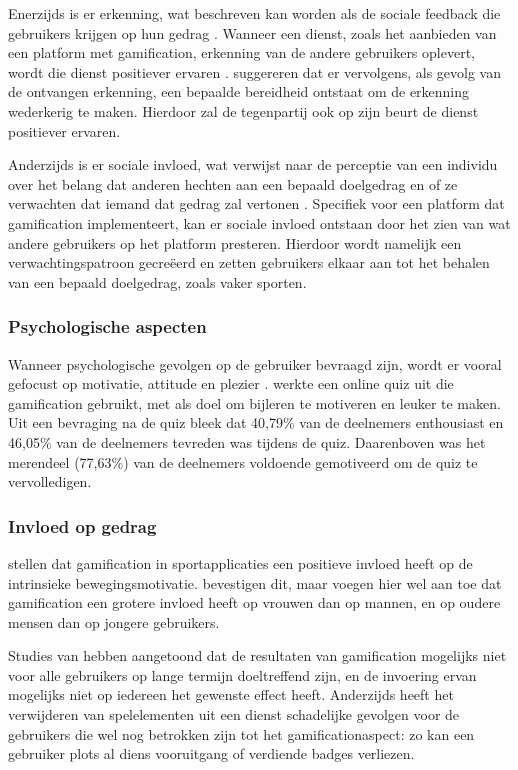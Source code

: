 Enerzijds is er erkenning, wat beschreven kan worden als de sociale feedback die gebruikers krijgen op hun gedrag \autocite{Cheung2011}.
Wanneer een dienst, zoals het aanbieden van een platform met gamification, erkenning van de andere gebruikers oplevert, wordt die dienst positiever ervaren \autocite{Preece2001}.
\textcite{Hamari2013} suggereren dat er vervolgens, als gevolg van de ontvangen erkenning, een bepaalde bereidheid ontstaat om de erkenning wederkerig te maken. Hierdoor zal de tegenpartij ook op zijn beurt de dienst positiever ervaren.

Anderzijds is er sociale invloed, wat verwijst naar de perceptie van een individu over het belang dat anderen hechten aan een bepaald doelgedrag en of ze verwachten dat iemand dat gedrag zal vertonen \autocite{Ajzen1991}. Specifiek voor een platform dat gamification implementeert, kan er sociale invloed ontstaan door het zien van wat andere gebruikers op het platform presteren. Hierdoor wordt namelijk een verwachtingspatroon gecreëerd en zetten gebruikers elkaar aan tot het behalen van een bepaald doelgedrag, zoals vaker sporten.

\subsubsection{Psychologische aspecten}
Wanneer psychologische gevolgen op de gebruiker bevraagd zijn, wordt er vooral gefocust op motivatie, attitude en plezier \autocite{Hamari2014}. \textcite{Cheong2013} werkte een online quiz uit die gamification gebruikt, met als doel om bijleren te motiveren en leuker te maken. Uit een bevraging  na de quiz bleek dat 40,79\% van de deelnemers enthousiast en 46,05\% van de deelnemers tevreden was tijdens de quiz. Daarenboven was het merendeel (77,63\%) van de deelnemers voldoende gemotiveerd om de quiz te vervolledigen.

\subsubsection{Invloed op gedrag}

\textcite{Kari2016} stellen dat gamification in sportapplicaties een positieve invloed heeft op de intrinsieke bewegingsmotivatie. \textcite{PoloPena2020} bevestigen dit, maar voegen hier wel aan toe dat gamification een grotere invloed heeft op vrouwen dan op mannen, en op oudere mensen dan op jongere gebruikers.

Studies van \textcite{Hamari2013a} hebben aangetoond dat de resultaten van gamification mogelijks niet voor alle gebruikers op lange termijn doeltreffend zijn, en de invoering ervan mogelijks niet op iedereen het gewenste effect heeft.
Anderzijds heeft het verwijderen van spelelementen uit een dienst schadelijke gevolgen voor de gebruikers die wel nog betrokken zijn tot het gamificationaspect: zo kan een gebruiker plots al diens vooruitgang of verdiende badges verliezen.

